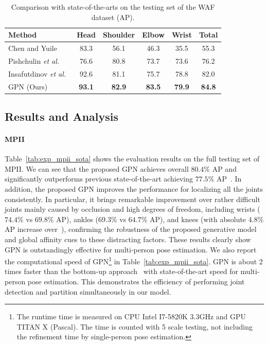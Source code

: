 \documentclass[10pt,twocolumn,letterpaper]{article}
\begin{document}
\begin{table}[t!]\footnotesize
  \caption{Comparison with state-of-the-arts on the testing set of the WAF dataset (AP).}
  \label{tab:exp_waf_sota}
  \centering
  \setlength{\tabcolsep}{5pt}
  \begin{tabular}{lccccc}
    \toprule
    Method   &Head & Shoulder & Elbow & Wrist & Total\\
    \midrule
    Chen and Yuile~\cite{chen2015parsing} & 83.3 & 56.1 & 46.3 & 35.5 & 55.3 \\
    Pishchulin \emph{et al.}~\cite{hpe:deepcut_cvpr16} & 76.6 & 80.8 & 73.7 & 73.6 & 76.2 \\
    Insafutdinov \emph{et al.}~\cite{hpe:deepercut_eccv16} & 92.6 & 81.1 & 75.7 & 78.8 & 82.0 \\
    \midrule
    GPN (Ours) & \textbf{93.1} & \textbf{82.9} & \textbf{83.5} & \textbf{79.9} & \textbf{84.8}\\
    \bottomrule
  \end{tabular}
\end{table}



\subsection{Results and Analysis}

\paragraph{MPII} Table~\ref{tab:exp_mpii_sota} shows the evaluation results on the full testing set of MPII. We can see that the proposed GPN achieves overall $80.4\%$ AP and significantly outperforms previous state-of-the-art achieving $77.5\%$ AP~\cite{newell2016associative}. In addition, the proposed GPN improves the performance for localizing all the joints consistently. In particular, it brings remarkable improvement over rather difficult joints mainly caused by occlusion and high degrees of freedom, including wrists ($74.4\%$ vs $69.8\%$ AP), ankles ($69.3\%$ vs $64.7\%$ AP), and knees (with absolute $4.8\%$ AP increase over~\cite{newell2016associative}), confirming the robustness of the proposed generative model and global affinity cues to these distracting factors. These results clearly show  GPN is outstandingly effective for multi-person pose estimation. We also report the computational speed of GPN\footnote{The runtime time is measured on CPU Intel I7-5820K 3.3GHz and GPU TITAN X (Pascal). The time is counted with 5 scale testing, not including the refinement time by single-person pose estimation.}   in Table~\ref{tab:exp_mpii_sota}.  GPN is about 2 times faster than the bottom-up approach~\cite{cao2017realtime} with state-of-the-art speed for multi-person pose estimation.
This demonstrates the efficiency of performing joint detection and partition simultaneously in our model.
\end{document}
